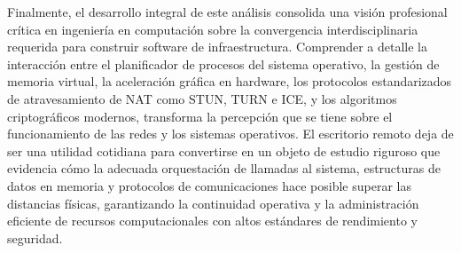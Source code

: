 \documentclass[12pt]{article}
\begin{document}
Finalmente, el desarrollo integral de este análisis consolida una visión profesional crítica en ingeniería en computación sobre la convergencia interdisciplinaria requerida para construir software de infraestructura. Comprender a detalle la interacción entre el planificador de procesos del sistema operativo, la gestión de memoria virtual, la aceleración gráfica en hardware, los protocolos estandarizados de atravesamiento de NAT como STUN, TURN e ICE, y los algoritmos criptográficos modernos, transforma la percepción que se tiene sobre el funcionamiento de las redes y los sistemas operativos. El escritorio remoto deja de ser una utilidad cotidiana para convertirse en un objeto de estudio riguroso que evidencia cómo la adecuada orquestación de llamadas al sistema, estructuras de datos en memoria y protocolos de comunicaciones hace posible superar las distancias físicas, garantizando la continuidad operativa y la administración eficiente de recursos computacionales con altos estándares de rendimiento y seguridad.

\nocite{*}
\printbibliography[heading=bibintoc, title={Referencias}]
\end{document}
